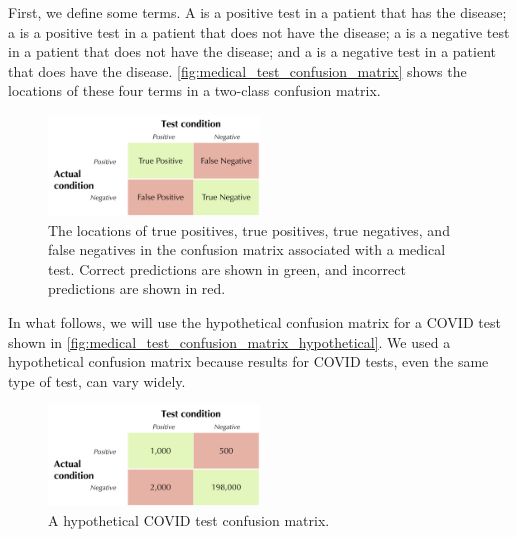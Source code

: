 First, we define some terms. A  is a positive test in a patient that has the disease; a  is a positive test in a patient that does not have the disease; a  is a negative test in a patient that does not have the disease; and a  is a negative test in a patient that does have the disease. \autoref{fig:medical_test_confusion_matrix} shows the locations of these four terms in a two-class confusion matrix.\\

\begin{figure}[h]
\centering
\mySfFamily
\includegraphics[width = 0.5\textwidth]{../images/medical_test_confusion_matrix.png}
\caption{The locations of true positives, true positives, true negatives, and false negatives in the confusion matrix associated with a medical test. Correct predictions are shown in green, and incorrect predictions are shown in red.}
\label{fig:medical_test_confusion_matrix}
\end{figure}

In what follows, we will use the hypothetical confusion matrix for a COVID test shown in \autoref{fig:medical_test_confusion_matrix_hypothetical}. We used a hypothetical confusion matrix because results for COVID tests, even the same type of test, can vary widely.\\

\begin{figure}[h]
\centering
\mySfFamily
\includegraphics[width = 0.5\textwidth]{../images/medical_test_confusion_matrix_hypothetical.png}
\caption{A hypothetical COVID test confusion matrix.}
\label{fig:medical_test_confusion_matrix_hypothetical}
\end{figure}

